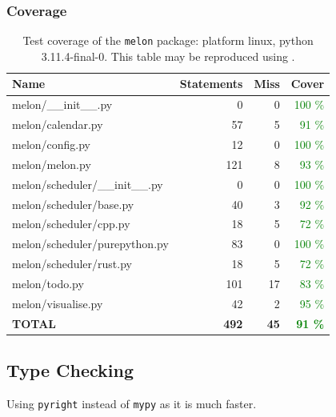 \documentclass{prettytex/ox/mmsc-special-topic}
\begin{document}
  \subsubsection{Coverage}
  \begin{table}[H]
    \centering
    \caption{Test coverage of the \texttt{melon} package: platform linux, python 3.11.4-final-0. This table may be reproduced using .}
    \begin{tabular}{lrrr}
      \hline
      \bf Name                        & \bf Statements & \bf Miss & \bf Cover                    \\
      \hline
      melon/\_\_init\_\_.py           & 0              & 0        & \textcolor{green}{100 \%}    \\
      melon/calendar.py               & 57             & 5        & \textcolor{green}{91 \%}     \\
      melon/config.py                 & 12             & 0        & \textcolor{green}{100 \%}    \\
      melon/melon.py                  & 121            & 8        & \textcolor{green}{93 \%}     \\
      melon/scheduler/\_\_init\_\_.py & 0              & 0        & \textcolor{green}{100 \%}    \\
      melon/scheduler/base.py         & 40             & 3        & \textcolor{green}{92 \%}     \\
      melon/scheduler/cpp.py          & 18             & 5        & \textcolor{green}{72 \%}     \\
      melon/scheduler/purepython.py   & 83             & 0        & \textcolor{green}{100 \%}    \\
      melon/scheduler/rust.py         & 18             & 5        & \textcolor{green}{72 \%}     \\
      melon/todo.py                   & 101            & 17       & \textcolor{green}{83 \%}     \\
      melon/visualise.py              & 42             & 2        & \textcolor{green}{95 \%}     \\
      \hline
      \bf TOTAL                       & \bf 492        & \bf 45   & \bf \textcolor{green}{91 \%}
    \end{tabular}
  \end{table}

  \subsection{Type Checking}
  Using \texttt{pyright} instead of \texttt{mypy} as it is much faster.
\end{document}
